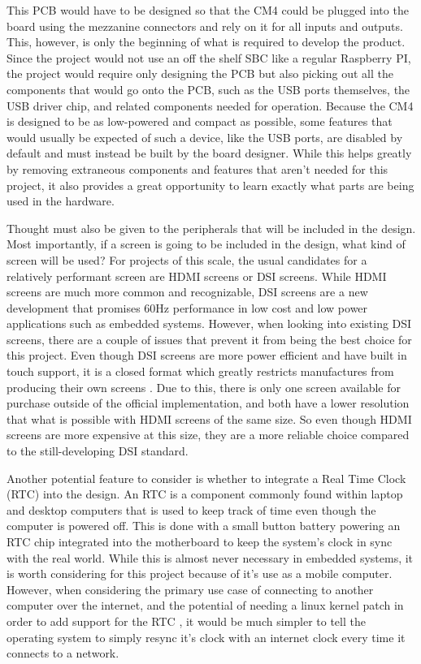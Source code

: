 This PCB would have to be designed so that the CM4 could be plugged into the board using the mezzanine connectors and rely on it for all inputs and outputs.
This, however, is only the beginning of what is required to develop the product.
Since the project would not use an off the shelf SBC like a regular Raspberry PI, the project would require only designing the PCB but also picking out all the components that would go onto the PCB, such as the USB ports themselves, the USB driver chip, and related components needed for operation.
Because the CM4 is designed to be as low-powered and compact as possible, some features that would usually be expected of such a device, like the USB ports, are disabled by default and must instead be built by the board designer.
While this helps greatly by removing extraneous components and features that aren't needed for this project, it also provides a great opportunity to learn exactly what parts are being used in the hardware.

Thought must also be given to the peripherals that will be included in the design.
Most importantly, if a screen is going to be included in the design, what kind of screen will be used?
For projects of this scale, the usual candidates for a relatively performant screen are HDMI screens or DSI screens.
While HDMI screens are much more common and recognizable, DSI screens are a new development that promises 60Hz performance in low cost and low power applications such as embedded systems.
However, when looking into existing DSI screens, there are a couple of issues that prevent it from being the best choice for this project.
Even though DSI screens are more power efficient and have built in touch support, it is a closed format which greatly restricts manufactures from producing their own screens \cite{dsi_vs_hdmi}.
Due to this, there is only one screen available for purchase outside of the official implementation, and both have a lower resolution that what is possible with HDMI screens of the same size.
So even though HDMI screens are more expensive at this size, they are a more reliable choice compared to the still-developing DSI standard.

Another potential feature to consider is whether to integrate a Real Time Clock (RTC) into the design.
An RTC is a component commonly found within laptop and desktop computers that is used to keep track of time even though the computer is powered off.
This is done with a small button battery powering an RTC chip integrated into the motherboard to keep the system's clock in sync with the real world.
While this is almost never necessary in embedded systems, it is worth considering for this project because of it's use as a mobile computer.
However, when considering the primary use case of connecting to another computer over the internet, and the potential of needing a linux kernel patch in order to add support for the RTC \cite{rtc_kernelpatch}, it would be much simpler to tell the operating system to simply resync it's clock with an internet clock every time it connects to a network.

